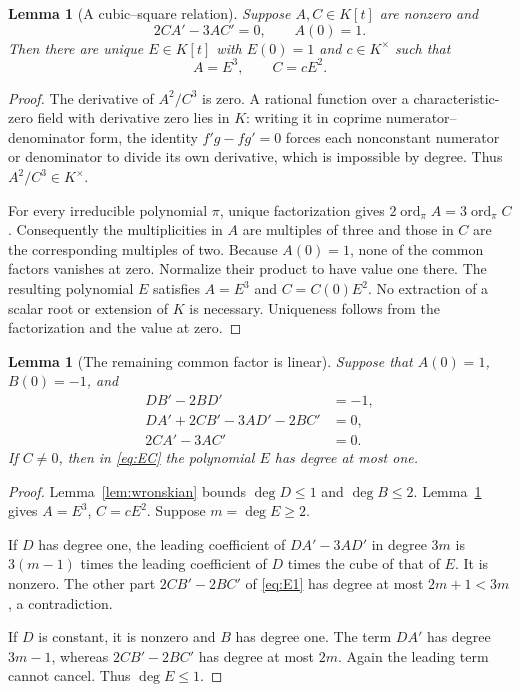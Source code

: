 \documentclass[11pt,a4paper]{article}
\numberwithin{equation}{section}
\newtheorem{lemma}[theorem]{Lemma}
\theoremstyle{definition}
\theoremstyle{remark}
\begin{document}
\begin{lemma}[A cubic--square relation]\label{lem:powers}
Suppose $A,C\in K[t]$ are nonzero and
\begin{equation}\label{eq:powers}
2CA'-3AC'=0,\qquad A(0)=1.
\end{equation}
Then there are unique $E\in K[t]$ with $E(0)=1$ and $c\in K^\times$ such
that
\begin{equation}\label{eq:EC}
A=E^3,\qquad C=cE^2.
\end{equation}
\end{lemma}
\begin{proof}
The derivative of $A^2/C^3$ is zero. A rational function over a
characteristic-zero field with derivative zero lies in $K$: writing it in
coprime numerator--denominator form, the identity $f'g-fg'=0$ forces each
nonconstant numerator or denominator to divide its own derivative, which
is impossible by degree. Thus $A^2/C^3\in K^\times$.

For every irreducible polynomial $\pi$, unique factorization gives
$2\operatorname{ord}_\pi A=3\operatorname{ord}_\pi C$. Consequently the
multiplicities in $A$ are multiples of three and those in $C$ are the
corresponding multiples of two. Because $A(0)=1$, none of the common
factors vanishes at zero. Normalize their product to have value one there.
The resulting polynomial $E$ satisfies $A=E^3$ and $C=C(0)E^2$.
No extraction of a scalar root or extension of $K$ is necessary.
Uniqueness follows from the factorization and the value at zero.
\end{proof}

\begin{lemma}[The remaining common factor is linear]\label{lem:Edegree}
Suppose that $A(0)=1$, $B(0)=-1$, and
\begin{align}
DB'-2BD'&=-1,\label{eq:E0}\\
DA'+2CB'-3AD'-2BC'&=0,\label{eq:E1}\\
2CA'-3AC'&=0.\label{eq:E2}
\end{align}
If $C\ne0$, then in \eqref{eq:EC} the polynomial $E$ has degree at most
one.
\end{lemma}
\begin{proof}
Lemma~\ref{lem:wronskian} bounds $\deg D\le1$ and $\deg B\le2$.
Lemma~\ref{lem:powers} gives $A=E^3$, $C=cE^2$. Suppose $m=\deg E\ge2$.

If $D$ has degree one, the leading coefficient of $DA'-3AD'$ in degree
$3m$ is $3(m-1)$ times the leading coefficient of $D$ times the cube of
that of $E$. It is nonzero. The other part $2CB'-2BC'$ of \eqref{eq:E1}
has degree at most $2m+1<3m$, a contradiction.

If $D$ is constant, it is nonzero and $B$ has degree one. The term $DA'$
has degree $3m-1$, whereas $2CB'-2BC'$ has degree at most $2m$.
Again the leading term cannot cancel. Thus $\deg E\le1$.
\end{proof}
\end{document}
